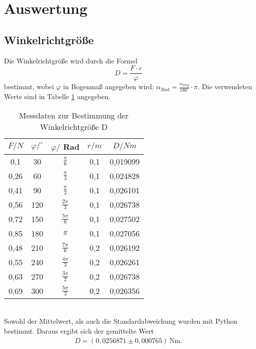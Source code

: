 \section{Auswertung}
\label{sec:Auswertung}

\subsection{Winkelrichtgröße}
\label{sec:Winkelrichtgroeße}
Die Winkelrichtgröße wird durch die Formel
\begin{equation}
  D = \frac{F \cdot r}{\varphi}
\end{equation}
bestimmt, wobei $\varphi$ in Bogenmaß angegeben wird: $\alpha_{Rad} = \frac{\alpha_{Deg}}{180^{\circ}}\cdot \pi $. 
Die verwendeten Werte sind in Tabelle \ref{tab:winkelrichtgr} angegeben.
\begin{table}
  \centering
  \caption{Messdaten zur Bestimmung der Winkelrichtgröße D}
  \label{tab:winkelrichtgr}
  \begin{tabular}{c c c c c}
    \toprule
    $F/N$ & $\varphi /^{\circ}$ & $\varphi /$ Rad & $r/m$ & $D/Nm$ \\
    \midrule
    0,1  &  30 & $\frac{\pi}{6}$ & 0,1 & 0,019099 \\
    0,26 &  60 & $\frac{\pi}{3}$ & 0,1 & 0,024828 \\
    0,41 &  90 & $\frac{\pi}{2}$ & 0,1 & 0,026101 \\
    0,56 & 120 & $\frac{2\pi}{3}$ & 0,1 & 0,026738 \\
    0,72 & 150 & $\frac{5\pi}{6}$ & 0,1 & 0,027502 \\
    0,85 & 180 & $\pi$ & 0,1 & 0,027056 \\
    0,48 & 210 & $\frac{7\pi}{6}$ & 0,2 & 0,026192 \\
    0,55 & 240 & $\frac{4\pi}{3}$ & 0,2 & 0,026261 \\
    0,63 & 270 & $\frac{3\pi}{2}$ & 0,2 & 0,026738 \\
    0,69 & 300 & $\frac{5\pi}{3}$ & 0,2 & 0,026356 \\
    \bottomrule
  \end{tabular}
\end{table}
\\Sowohl der Mittelwert, als auch die Standardabweichung wurden mit Python bestimmt. Daraus ergibt sich der
gemittelte Wert
\begin{align*}
    D = (0{,}0256871 \pm 0{,}000765)\,\mathrm{Nm} .
\end{align*}

